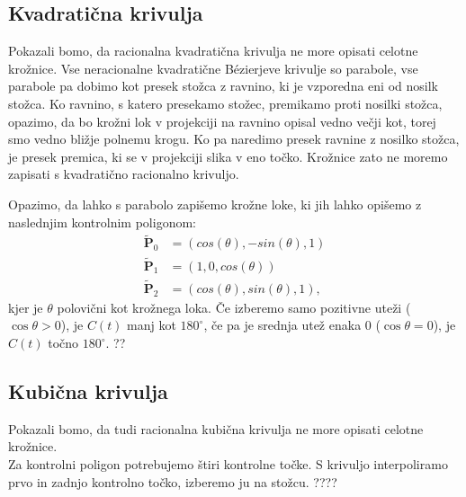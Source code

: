 \documentclass[a4paper,11pt]{article}
\theoremstyle{definition}
\theoremstyle{plain}
\begin{document}
\subsection{ Kvadratična krivulja}
Pokazali bomo, da racionalna kvadratična krivulja ne more opisati celotne krožnice. Vse neracionalne kvadratične B\'ezierjeve krivulje so parabole, vse parabole pa dobimo kot presek stožca z ravnino, ki je vzporedna eni od nosilk stožca. Ko ravnino, s katero presekamo stožec, premikamo proti nosilki stožca, opazimo, da bo krožni lok v projekciji  na ravnino opisal vedno večji kot, torej smo vedno bližje polnemu krogu. Ko pa naredimo presek ravnine z nosilko stožca, je presek premica, ki se v projekciji slika v eno točko. Krožnice zato ne moremo zapisati s kvadratično racionalno krivuljo. 

Opazimo, da lahko s parabolo zapišemo krožne loke, ki jih lahko opišemo z naslednjim kontrolnim poligonom:
\begin{align*}
\boldsymbol{\tilde{P}}_0 &= (cos(\theta), -sin(\theta), 1)\\
\boldsymbol{\tilde{P}}_1 &= (1, 0, cos(\theta))\\
\boldsymbol{\tilde{P}}_2 &= (cos(\theta), sin(\theta), 1),
\end{align*}
kjer je $\theta$ polovični kot krožnega loka. Če izberemo samo pozitivne uteži ($\cos{\theta}>0$), je $C(t)$ manj kot $180^{\circ}$, če pa je srednja utež enaka $0$ ($\cos{\theta}=0$), je $C(t)$ točno $180^{\circ}$. ??

\subsection{Kubična krivulja}
Pokazali bomo, da tudi racionalna kubična krivulja ne more opisati celotne krožnice. \\
Za kontrolni poligon potrebujemo štiri kontrolne točke. S krivuljo interpoliramo prvo in zadnjo kontrolno točko, izberemo ju na stožcu.
????
\end{document}
